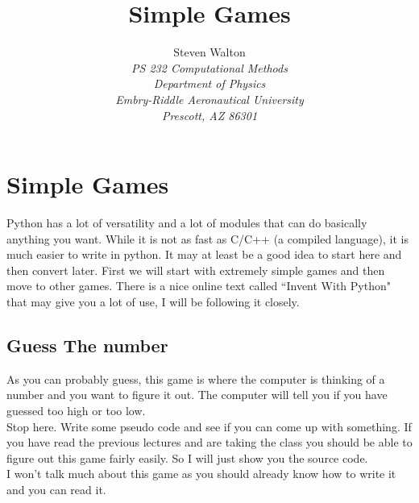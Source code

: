 \documentclass[11pt]{article}   %
\title{Simple Games}
\author{Steven Walton\\     %
\textit{PS 232 Computational Methods}\\
\textit{Department of Physics}\\
\textit{Embry-Riddle Aeronautical University}\\
\textit{Prescott, AZ   86301}}
\begin{document}
\maketitle
\section*{Simple Games}
Python has a lot of versatility and a lot of modules that can do basically anything you want.  While it is not as fast as C/C++ (a compiled language), it is much easier to write in python.  It may at least be a good idea to 
start here and then convert later.  First we will start with extremely simple games and then move to other games.  There is a nice online text called ``Invent With Python" that may give you a lot of use, I will be following it
closely.

\subsection*{Guess The number}
As you can probably guess, this game is where the computer is thinking of a number and you want to figure it out.  The computer will tell you if you have guessed too high or too low.
\\
Stop here.  Write some pseudo code and see if you can come up with something.  If you have read the previous lectures and are taking the class you should be able to figure out this game fairly easily.  So I will just show you the 
source code. 
\\
I won't talk much about this game as you should already know how to write it and you can read it.
\end{document}
